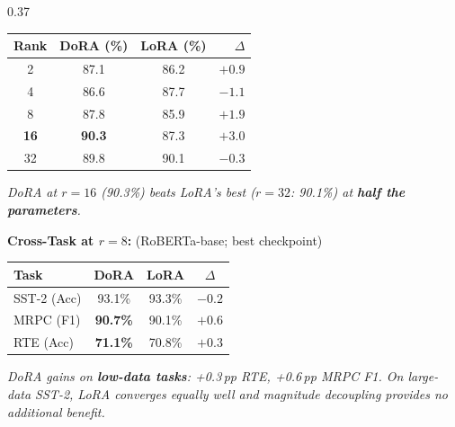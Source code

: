 \documentclass[final]{beamer}
\newcommand{\hl}[1]{\textcolor{CornellRed}{\textbf{#1}}}
\newcommand{\lb}[1]{\textbf{#1:}\;}
\begin{document}
\begin{frame}[t]
\begin{columns}[T,totalwidth=\textwidth]
\begin{column}{0.37\textwidth}
\begin{tcolorbox}[posterblock,title=NLP Results — GLUE Benchmark]
  \vspace{0.12cm}
  \begin{center}\small
  \begin{tabular}{@{}cccr@{}}
    \toprule
    \textbf{Rank} & \textbf{DoRA (\%)} & \textbf{LoRA (\%)} & $\Delta$ \\
    \midrule
    2  & 87.1 & 86.2 & $+0.9$ \\
    4  & 86.6 & 87.7 & $-1.1$ \\
    8  & 87.8 & 85.9 & $+1.9$ \\
    \rowcolor{TableShade}
    \textbf{16} & \textbf{90.3} & 87.3 & $\boldsymbol{+3.0}$ \\
    32 & 89.8 & 90.1 & $-0.3$ \\
    \bottomrule
  \end{tabular}
  \end{center}

  \vspace{0.08cm}
  \small\textit{DoRA at $r=16$ (90.3\%) beats LoRA's best ($r=32$: 90.1\%)
  at \textbf{half the parameters}.}

  \vspace{0.12cm}
  \lb{Cross-Task at $r=8$} (RoBERTa-base; best checkpoint)

  \vspace{0.08cm}
  \begin{center}\small
  \begin{tabular}{@{}lccc@{}}
    \toprule
    \textbf{Task} & \textbf{DoRA} & \textbf{LoRA} & $\Delta$ \\
    \midrule
    SST-2 (Acc) & 93.1\% & 93.3\% & $-0.2$ \\
    MRPC (F1) & \textbf{90.7\%} & 90.1\% & $+0.6$ \\
    \rowcolor{TableShade}
    RTE (Acc) & \textbf{71.1\%} & 70.8\% & $\boldsymbol{+0.3}$ \\
    \bottomrule
  \end{tabular}
  \end{center}

  \vspace{0.1cm}
  \small\textit{DoRA gains on \hl{low-data tasks}: +0.3\,pp RTE,
  +0.6\,pp MRPC F1. On large-data SST-2, LoRA converges equally
  well and magnitude decoupling provides no additional benefit.}


\end{tcolorbox}
\end{column}
\end{columns}
\end{frame}
\end{document}
